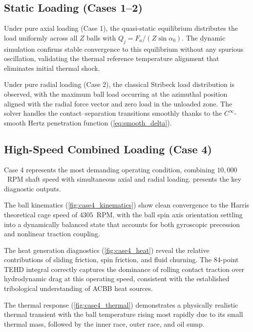 \documentclass[preprint,12pt]{elsarticle}
\begin{document}
\subsection{Static Loading (Cases 1--2)}

Under pure axial loading (Case 1), the quasi-static equilibrium distributes the load uniformly across all $Z$ balls with $Q_j = F_a / (Z \sin\alpha_0)$. The dynamic simulation confirms stable convergence to this equilibrium without any spurious oscillation, validating the thermal reference temperature alignment that eliminates initial thermal shock.

Under pure radial loading (Case 2), the classical Stribeck load distribution is observed, with the maximum ball load occurring at the azimuthal position aligned with the radial force vector and zero load in the unloaded zone. The solver handles the contact--separation transitions smoothly thanks to the $C^\infty$-smooth Hertz penetration function (\cref{eq:smooth_delta}).

\subsection{High-Speed Combined Loading (Case 4)}

Case 4 represents the most demanding operating condition, combining $10{,}000$~RPM shaft speed with simultaneous axial and radial loading.  presents the key diagnostic outputs.

The ball kinematics (\cref{fig:case4_kinematics}) show clean convergence to the Harris theoretical cage speed of $4305$~RPM, with the ball spin axis orientation settling into a dynamically balanced state that accounts for both gyroscopic precession and nonlinear traction coupling.

The heat generation diagnostics (\cref{fig:case4_heat}) reveal the relative contributions of sliding friction, spin friction, and fluid churning. The 84-point TEHD integral correctly captures the dominance of rolling contact traction over hydrodynamic drag at this operating speed, consistent with the established tribological understanding of ACBB heat sources.

The thermal response (\cref{fig:case4_thermal}) demonstrates a physically realistic thermal transient with the ball temperature rising most rapidly due to its small thermal mass, followed by the inner race, outer race, and oil sump.
\end{document}
